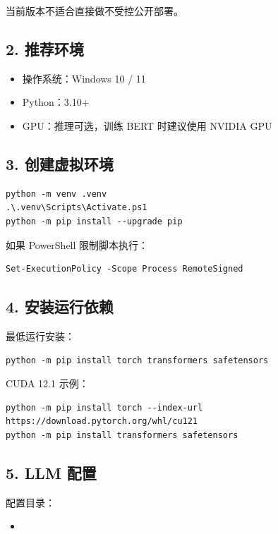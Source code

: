 \documentclass[11pt,a4paper]{ctexart}
\begin{document}
当前版本不适合直接做不受控公开部署。

\subsection*{2. 推荐环境}

\begin{itemize}
\item 操作系统：Windows 10 / 11
\item Python：3.10+
\item GPU：推理可选，训练 BERT 时建议使用 NVIDIA GPU
\end{itemize}

\subsection*{3. 创建虚拟环境}

\begin{verbatim}
python -m venv .venv
.\.venv\Scripts\Activate.ps1
python -m pip install --upgrade pip
\end{verbatim}

如果 PowerShell 限制脚本执行：

\begin{verbatim}
Set-ExecutionPolicy -Scope Process RemoteSigned
\end{verbatim}

\subsection*{4. 安装运行依赖}

最低运行安装：

\begin{verbatim}
python -m pip install torch transformers safetensors
\end{verbatim}

CUDA 12.1 示例：

\begin{verbatim}
python -m pip install torch --index-url https://download.pytorch.org/whl/cu121
python -m pip install transformers safetensors
\end{verbatim}

\subsection*{5. LLM 配置}

配置目录：

\begin{itemize}
\item {}
\end{itemize}
\end{document}
